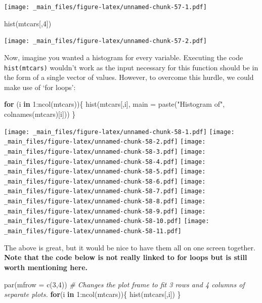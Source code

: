 \documentclass[
]{book}
\newenvironment{Shaded}{\begin{snugshade}}{\end{snugshade}}
\newcommand{\AttributeTok}[1]{\textcolor[rgb]{0.77,0.63,0.00}{#1}}
\newcommand{\CommentTok}[1]{\textcolor[rgb]{0.56,0.35,0.01}{\textit{#1}}}
\newcommand{\ControlFlowTok}[1]{\textcolor[rgb]{0.13,0.29,0.53}{\textbf{#1}}}
\newcommand{\DecValTok}[1]{\textcolor[rgb]{0.00,0.00,0.81}{#1}}
\newcommand{\FunctionTok}[1]{\textcolor[rgb]{0.00,0.00,0.00}{#1}}
\newcommand{\NormalTok}[1]{#1}
\newcommand{\SpecialCharTok}[1]{\textcolor[rgb]{0.00,0.00,0.00}{#1}}
\newcommand{\StringTok}[1]{\textcolor[rgb]{0.31,0.60,0.02}{#1}}
\theoremstyle{definition}
\theoremstyle{definition}
\theoremstyle{definition}
\theoremstyle{definition}
\theoremstyle{remark}
\begin{document}
\texttt{[image: \_main\_files/figure-latex/unnamed-chunk-57-1.pdf]}

\begin{Shaded}
\begin{Highlighting}[]
\FunctionTok{hist}\NormalTok{(mtcars[,}\DecValTok{4}\NormalTok{])}
\end{Highlighting}
\end{Shaded}

\texttt{[image: \_main\_files/figure-latex/unnamed-chunk-57-2.pdf]}

Now, imagine you wanted a histogram for every variable. Executing the code \texttt{hist(mtcars)} wouldn't work as the input necessary for this function should be in the form of a single vector of values. However, to overcome this hurdle, we could make use of `for loops':

\begin{Shaded}
\begin{Highlighting}[]
\ControlFlowTok{for}\NormalTok{ (i }\ControlFlowTok{in} \DecValTok{1}\SpecialCharTok{:}\FunctionTok{ncol}\NormalTok{(mtcars))\{}
  \FunctionTok{hist}\NormalTok{(mtcars[,i], }\AttributeTok{main =} \FunctionTok{paste}\NormalTok{(}\StringTok{"Histogram of"}\NormalTok{, }\FunctionTok{colnames}\NormalTok{(mtcars)[i]))}
\NormalTok{\}}
\end{Highlighting}
\end{Shaded}

\texttt{[image: \_main\_files/figure-latex/unnamed-chunk-58-1.pdf]} \texttt{[image: \_main\_files/figure-latex/unnamed-chunk-58-2.pdf]} \texttt{[image: \_main\_files/figure-latex/unnamed-chunk-58-3.pdf]} \texttt{[image: \_main\_files/figure-latex/unnamed-chunk-58-4.pdf]} \texttt{[image: \_main\_files/figure-latex/unnamed-chunk-58-5.pdf]} \texttt{[image: \_main\_files/figure-latex/unnamed-chunk-58-6.pdf]} \texttt{[image: \_main\_files/figure-latex/unnamed-chunk-58-7.pdf]} \texttt{[image: \_main\_files/figure-latex/unnamed-chunk-58-8.pdf]} \texttt{[image: \_main\_files/figure-latex/unnamed-chunk-58-9.pdf]} \texttt{[image: \_main\_files/figure-latex/unnamed-chunk-58-10.pdf]} \texttt{[image: \_main\_files/figure-latex/unnamed-chunk-58-11.pdf]}

The above is great, but it would be nice to have them all on one screen together. \textbf{Note that the code below is not really linked to for loops but is still worth mentioning here.}

\begin{Shaded}
\begin{Highlighting}[]
\FunctionTok{par}\NormalTok{(}\AttributeTok{mfrow =} \FunctionTok{c}\NormalTok{(}\DecValTok{3}\NormalTok{,}\DecValTok{4}\NormalTok{)) }\CommentTok{\# Changes the plot frame to fit 3 rows and 4 columns of separate plots.}
\ControlFlowTok{for}\NormalTok{(i }\ControlFlowTok{in} \DecValTok{1}\SpecialCharTok{:}\FunctionTok{ncol}\NormalTok{(mtcars))\{}
  \FunctionTok{hist}\NormalTok{(mtcars[,i])}
\NormalTok{\}}
\end{Highlighting}
\end{Shaded}
\end{document}

